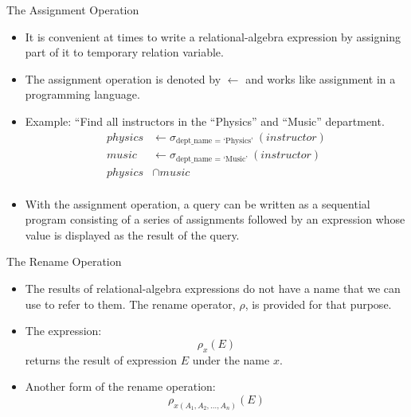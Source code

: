 \documentclass[aspectratio=169]{beamer}
\begin{document}
\begin{frame}{The Assignment Operation}
    \begin{itemize}
        \item It is convenient at times to write a relational-algebra expression by assigning part of it to temporary relation variable.
        \item The assignment operation is denoted by $\leftarrow$ and works like assignment in a programming language.
        \item Example: ``Find all instructors in the ``Physics'' and ``Music'' department.
        \begin{align*}
            physics &\leftarrow \sigma_{\text{dept\_name } = \text{ `Physics' }} (instructor) \\
            music &\leftarrow \sigma_{\text{dept\_name } = \text{ `Music' }} (instructor) \\
            physics &\cap music \\
        \end{align*}
        \item With the assignment operation, a query can be written as a sequential program consisting of a series of assignments followed by an expression whose value is displayed as the result of the query.
    \end{itemize}
\end{frame}

\begin{frame}{The Rename Operation}
    \begin{itemize}
        \item The results of relational-algebra expressions do not have a name that we can use to refer to them. The rename operator, $\rho$, is provided for that purpose.
        \item The expression:
            $$
                {\rho_x(E) }
            $$
            returns the result of expression $E$ under the name $x$.
        \item Another form of the rename operation:
            $$
                {\rho_{x(A_1, A_2, \ldots, A_n)}(E) }
            $$
    \end{itemize}
\end{frame}
\end{document}
